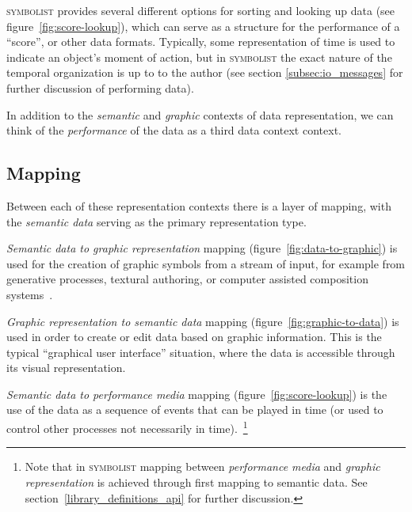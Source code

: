 \documentclass{article}
\def\symbolist{\textsc{symbolist}\xspace}
\begin{document}
\symbolist provides several different options for sorting and looking up data (see figure~\ref{fig:score-lookup}), which can serve as a structure for the performance of a ``score'', or other data formats. Typically, some representation of time is used to indicate an object's moment of action, but in \symbolist the exact nature of the temporal organization is up to to the author (see section \ref{subsec:io_messages} for further discussion of performing data). 

In addition to the \textit{semantic} and \textit{graphic} contexts of data representation, we can think of the \textit{performance} of the data as a third data context context.

\subsection{Mapping}\label{subsec:mapping}

Between each of these representation contexts there is a layer of mapping, with the \textit{semantic data} serving as the primary representation type. 

\textit{Semantic data to graphic representation} mapping (figure~\ref{fig:data-to-graphic}) is used for the creation of graphic symbols from a stream of input, for example from generative processes, textural authoring, or computer assisted composition systems~\cite{bresson2011om, didkovsky2008maxscore, agostini2015max, baca2015abjad, burloiu2017visual}.

\textit{Graphic representation to semantic data} mapping (figure~\ref{fig:graphic-to-data}) is used in order to create or edit data based on graphic information. This is the typical ``graphical user interface'' situation, where the data is accessible through its visual representation.

\textit{Semantic data to performance media} mapping (figure~\ref{fig:score-lookup}) is the use of the data as a sequence of events that can be played in time (or used to control other processes not necessarily in time).~\footnote{Note that in \symbolist mapping between \textit{performance media} and \textit{graphic representation} is achieved through first mapping to semantic data. See section~\ref{library_definitions_api} for further discussion.}

\end{document}

